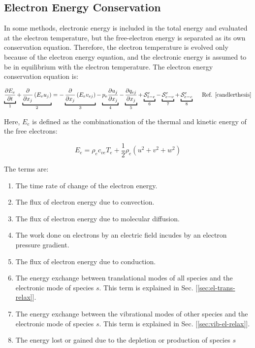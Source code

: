 \documentclass[10pt]{article}
\begin{document}
\begin{flushleft}
\subsection{Electron Energy Conservation}

In some methods, electronic energy is included in the total energy and evaluated at the electron temperature, but the free-electron energy is separated as its own conservation equation. Therefore, the electron temperature is evolved only because of the electron energy equation, and the electronic energy is assumed to be in equilibrium with the electron temperature. The electron energy conservation equation is:

\begin{equation}
\ub{\pd{E_e}{t}}{1} + \ub{\pd{}{x_j} \bp{E_e u_j}}{2} = - \ub{\pd{}{x_j} \bp{E_e v_{ej}}}{3} - \ub{p_e \pd{u_j}{x_j}}{4} - \ub{\pd{q_{ej}}{x_j}}{5} + \ub{\mathcal{S}_{t-e}^e}{6} - \ub{\mathcal{S}_{e-v}^{e}}{7} + \ub{\mathcal{S}_{e-c}^{e}}{8} \hspace{5mm} \text{Ref. \cite{candlerthesis}}
\end{equation}

Here, $E_e$ is defined as the combinationation of the thermal and kinetic energy of the free electrons:

\begin{equation*}
    E_e = \rho_e c_{ve} T_e + \frac{1}{2} \rho_e (u^2 + v^2 + w^2)
\end{equation*}

The terms are:

\begin{enumerate}
    \item The time rate of change of the electron energy.
    \item The flux of electron energy due to convection.
    \item The flux of electron energy due to molecular diffusion.
    \item The work done on electrons by an electric field incudes by an electron pressure gradient.
    \item The flux of electron energy due to conduction.
    \item The energy exchange between translational modes of all species and the electronic mode of species $s$. This term is explained in Sec. [\ref{sec:el-trans-relax}].
    \item The energy exchange between the vibrational modes of other species and the electronic mode of species $s$. This term is explained in Sec. [\ref{sec:vib-el-relax}].
    \item The energy lost or gained due to the depletion or production of species $s$   
\end{enumerate}



\end{flushleft}
\end{document}

